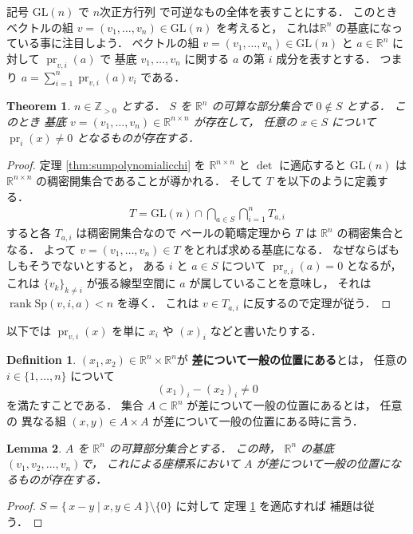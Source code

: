 \documentclass[leqno, a4paper, 12pt]{jsarticle}
\theoremstyle{plain}
\newtheorem{thm}{Theorem}[section]
\newtheorem{lem}[thm]{Lemma}
\theoremstyle{definition}
\newtheorem{df}{Definition}[section]
\theoremstyle{remark}
\newcommand{\zz}{\mathbb{Z}}
\newcommand{\rr}{\mathbb{R}}
\DeclareMathOperator{\rank}{rank}
\newcommand{\yoemph}[1]{\textbf{#1}}
\newcommand{\yoglsp}[1]{\mathrm{GL}(#1)}
\newcommand{\yospsp}[1]{\mathrm{Sp}(#1)}
\DeclareMathOperator{\pr}{pr}
\numberwithin{equation}{section}
\begin{document}
記号
$\yoglsp{n}$
で
$n$次正方行列
で可逆なもの全体を表すことにする．
このときベクトルの組
$v=(v_{1}, \dots, v_{n})\in \yoglsp{n}$
を考えると，
これは$\rr^{n}$
の基底になっている事に注目しよう．
ベクトルの組
$v=(v_{1}, \dots, v_{n})\in \yoglsp{n}$
と
$a\in \rr^{n}$
に対して
$\pr_{v, i}(a)$
で
基底
$v_{1}, \dots, v_{n}$
に関する
$a$
の第
$i$
成分を表すとする．
つまり
$a=\sum_{i=1}^{n}\pr_{v, i}(a)v_{i}$
である．




\begin{thm}\label{thm:bairebaire}
$n\in \zz_{>0}$
とする．
$S$
を
$\rr^{n}$
の可算な部分集合で
$0\not\in S$
とする．
このとき
基底
$v=(v_{1}, \dots, v_{n})\in \rr^{n\times n}$
が存在して，
任意の
$x\in S$
について
$\pr_i(x)\neq 0$
となるものが存在する．
\end{thm}
\begin{proof}
定理
\ref{thm:sumpolynomialicchi}
を
$\rr^{n\times n}$
と
$\det$
に適応すると
$\yoglsp{n}$
は
$\rr^{n\times n}$
の稠密開集合であることが導かれる．
そして
$T$
を以下のように定義する．
\begin{align}
T=\yoglsp{n}\cap \bigcap_{a\in S}\bigcap_{i=1}^{n}T_{a, i}
\end{align}
すると各
$T_{a, i}$
は稠密開集合なので
ベールの範疇定理から
$T$
は
$\rr^{n}$
の稠密集合となる．
よって
$v=(v_{1}, \dots, v_{n})\in T$
をとれば求める基底になる．
なぜならばもしもそうでないとすると，
ある
$i$
と
$a\in S$
について
$\pr_{v, i}(a)=0$
となるが，
これは
$\{v_{k}\}_{k\neq i}$
が張る線型空間に
$a$
が属していることを意味し，
それは
$\rank \yospsp{v, i, a}<n$
を導く．
これは
$v\in T_{a, i}$
に反するので定理が従う．
\end{proof}


以下では
$\pr_{v, i}(x)$
を単に
$x_{i}$
や
$(x)_{i}$
などと書いたりする．
\begin{df}
$(x_1,x_2)\in  \rr^n\times \rr^n$が
\yoemph{差について一般の位置にある}とは，
任意の
$i\in \{1,\dots, 
n\}$
について
\[
(x_{1})_{i}-(x_{2})_{i}\neq 0
\]
を満たすことである．
集合
$A \subset \rr^{n}$
が差について一般の位置にあるとは，
任意の
異なる組
$(x, y)\in A\times A$
が差について一般の位置にある時に言う．
\end{df}



\begin{lem}\label{lem:sum:cdh:59}
$A$
を
$\rr^{n}$
の可算部分集合とする．
この時，
$\rr^{n}$
の基底
$(v_{1},v_{2},\dots, v_{n})$で，
これによる座標系において
$A$
が差について一般の位置になるものが存在する．
\end{lem}
\begin{proof}
$S=\{\, 
x-y\mid x, y\in A
\, \}\setminus \{0\}$
に対して
定理
\ref{thm:bairebaire}
を適応すれば
補題は従う．
\end{proof}
\end{document}
